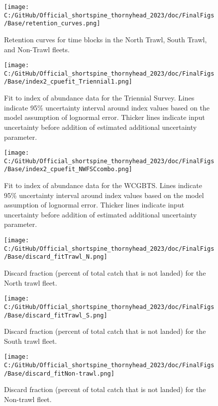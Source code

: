 \documentclass[11pt,
  english,
  letterpaper,
]{article}
\begin{document}
\begin{figure}
\centering
\texttt{[image: C:/GitHub/Official\_shortspine\_thornyhead\_2023/doc/FinalFigs/Base/retention\_curves.png]}
\caption{Retention curves for time blocks in the North Trawl, South Trawl, and Non-Trawl fleets.\label{fig:retblocks}}
\end{figure}

\begin{figure}
\centering
\texttt{[image: C:/GitHub/Official\_shortspine\_thornyhead\_2023/doc/FinalFigs/Base/index2\_cpuefit\_Triennial1.png]}
\caption{Fit to index of abundance data for the Triennial Survey. Lines indicate 95\% uncertainty interval around index values based on the model assumption of lognormal error. Thicker lines indicate input uncertainty before addition of estimated additional uncertainty parameter.\label{fig:fitsTri1}}
\end{figure}

\begin{figure}
\centering
\texttt{[image: C:/GitHub/Official\_shortspine\_thornyhead\_2023/doc/FinalFigs/Base/index2\_cpuefit\_NWFSCcombo.png]}
\caption{Fit to index of abundance data for the WCGBTS. Lines indicate 95\% uncertainty interval around index values based on the model assumption of lognormal error. Thicker lines indicate input uncertainty before addition of estimated additional uncertainty parameter.\label{fig:fitscombo}}
\end{figure}

\begin{figure}
\centering
\texttt{[image: C:/GitHub/Official\_shortspine\_thornyhead\_2023/doc/FinalFigs/Base/discard\_fitTrawl\_N.png]}
\caption{Discard fraction (percent of total catch that is not landed) for the North trawl fleet.\label{fig:northtrl_disc}}
\end{figure}

\begin{figure}
\centering
\texttt{[image: C:/GitHub/Official\_shortspine\_thornyhead\_2023/doc/FinalFigs/Base/discard\_fitTrawl\_S.png]}
\caption{Discard fraction (percent of total catch that is not landed) for the South trawl fleet.\label{fig:southtrl_disc}}
\end{figure}

\begin{figure}
\centering
\texttt{[image: C:/GitHub/Official\_shortspine\_thornyhead\_2023/doc/FinalFigs/Base/discard\_fitNon-trawl.png]}
\caption{Discard fraction (percent of total catch that is not landed) for the Non-trawl fleet.\label{fig:nontrl_disc}}
\end{figure}
\end{document}
